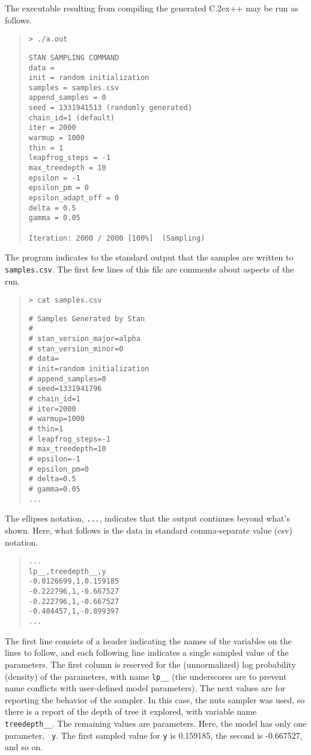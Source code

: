 \documentclass[10pt]{report}
\newcommand*{\Cpp}{C\raise.2ex\hbox{\footnotesize ++}\xspace} %
\newcommand{\acronym}[1]{{\sc #1}\xspace}
\newcommand{\NUTS}{\acronym{nuts}}
\newcommand{\code}[1]{{\tt #1}}
\begin{document}
The executable resulting from compiling the generated \Cpp may be run
as follows.
%
\begin{quote}
\begin{Verbatim}[fontshape=sl]
> ./a.out
\end{Verbatim}
%
\begin{Verbatim}
STAN SAMPLING COMMAND
data = 
init = random initialization
samples = samples.csv
append_samples = 0
seed = 1331941513 (randomly generated)
chain_id=1 (default)
iter = 2000
warmup = 1000
thin = 1
leapfrog_steps = -1
max_treedepth = 10
epsilon = -1
epsilon_pm = 0
epsilon_adapt_off = 0
delta = 0.5
gamma = 0.05

Iteration: 2000 / 2000 [100%]  (Sampling)
\end{Verbatim}
\end{quote}
%
The program indicates to the standard output that the samples are
written to \code{samples.csv}.  The first few lines of this file
are comments about aspects of the run.
%
\begin{quote}
\begin{Verbatim}[fontshape=sl]
> cat samples.csv
\end{Verbatim}
\begin{Verbatim}
# Samples Generated by Stan
#
# stan_version_major=alpha
# stan_version_minor=0
# data=
# init=random initialization
# append_samples=0
# seed=1331941796
# chain_id=1
# iter=2000
# warmup=1000
# thin=1
# leapfrog_steps=-1
# max_treedepth=10
# epsilon=-1
# epsilon_pm=0
# delta=0.5
# gamma=0.05
...
\end{Verbatim}
\end{quote}
%
The ellipses notation, {\tt ...}, indicates that the output continues
beyond what's shown.  Here, what follows is the data in standard
comma-separate value ({\sc csv}) notation.
%
\begin{quote}
\begin{Verbatim}
...
lp__,treedepth__,y
-0.0126699,1,0.159185
-0.222796,1,-0.667527
-0.222796,1,-0.667527
-0.404457,1,-0.899397
...
\end{Verbatim}
\end{quote}
%
The first line consists of a header indicating the names of the
variables on the lines to follow, and each following line indicates a
single sampled value of the parameters.  The first column is reserved
for the (unnormalized) log probability (density) of the parameters,
with name {\tt lp\_\_} (the underscores are to prevent name conflicts
with user-defined model parameters).  The next values are for
reporting the behavior of the sampler.  In this case, the \NUTS
sampler was used, so there is a report of the depth of tree it
explored, with variable name {\tt treedepth\_\_}.  The remaining
values are parameters.  Here, the model has only one parameter, {\tt
  y}.  The first sampled value for {\tt y} is 0.159185, the second is
-0.667527, and so on.  
\end{document}
